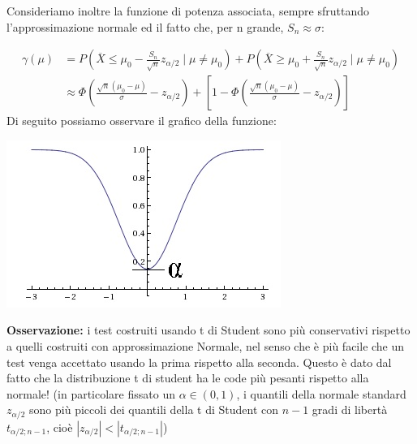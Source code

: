 Consideriamo inoltre la funzione di potenza associata, sempre sfruttando l'approssimazione normale ed il fatto che, per n grande, $S_n \approx \sigma$:

\begin{align*}
\gamma(\mu) &=P(\overline{X} \leq \mu_0 - \frac{S_n}{\sqrt{n}}z_{\alpha/2} \mid \mu \neq \mu_0 ) 
+ P(\overline{X} \geq \mu_0 + \frac{S_n}{\sqrt{n}}z_{\alpha/2} \mid \mu \neq \mu_0 )
\\ & \approx \Phi\left( \frac{\sqrt{n}(\mu_0 - \mu)}{\sigma} - z_{\alpha / 2} \right)
 + \left[ 1 - \Phi\left( \frac{\sqrt{n}(\mu_0 - \mu)}{\sigma} - z_{\alpha / 2} \right) \right]
\end{align*}
Di seguito possiamo osservare il grafico della funzione:\\
\begin{center}
\includegraphics {immagini/potenza_bilaterale.jpg}
\end{center}

\textbf{Osservazione:} i test costruiti usando t di Student sono più conservativi rispetto a quelli costruiti con approssimazione Normale, nel senso che è più facile che un test venga accettato usando la prima rispetto alla seconda. Questo è dato dal fatto che la distribuzione t di student ha le code più pesanti rispetto alla normale! (in particolare fissato un 
$\alpha \in (0,1)$,
 i quantili della normale standard $z_{\alpha/2}$ sono più piccoli dei quantili della t di Student con $n-1$ gradi di libertà $t_{\alpha/2; n-1}$, cioè 
$|z_{\alpha/2}| < |t_{\alpha/2; n-1}|$)
\\ \\
